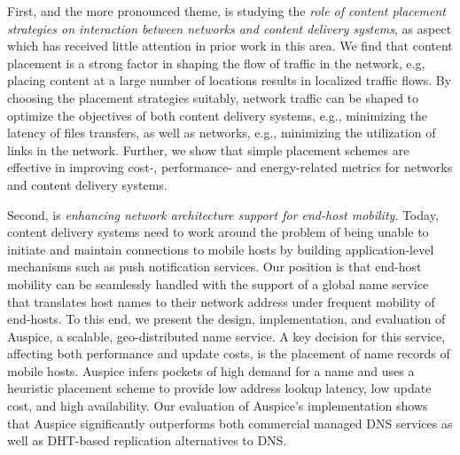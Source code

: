 



First, and the more pronounced theme, is studying the \emph{role of content placement strategies on interaction between networks and content delivery systems}, as aspect which has received little attention in prior work in this area. We find that content placement is a strong factor in shaping the flow of  traffic in the network, e.g, placing content at a large number of locations results in localized traffic flows. By choosing the placement strategies suitably, network traffic can be shaped to optimize the objectives of both content delivery systems, e.g., minimizing the latency of files transfers, as well as networks, e.g., minimizing the utilization of links in the network. Further, we show that simple placement schemes are effective in improving cost-, performance- and energy-related metrics for networks and content delivery systems.

Second, is \emph{enhancing network architecture support for end-host mobility}.  Today, content delivery systems need to work around the problem of being unable to initiate and maintain connections to mobile hosts by building application-level mechanisms such as push notification services. Our position is that end-host mobility can be seamlessly handled with the support of a global name service that translates host names to their network address under frequent  mobility of end-hosts.  To this end, we present the design, implementation, and evaluation of Auspice, a scalable, geo-distributed name service.  A key decision for this service, affecting both performance and update costs, is the placement of name records of mobile hosts. Auspice infers pockets of high demand for a name and uses a heuristic placement scheme to provide low address lookup latency, low update cost, and high availability. Our evaluation of Auspice's implementation  shows that Auspice significantly outperforms both commercial managed DNS services as well as DHT-based replication alternatives to DNS.


